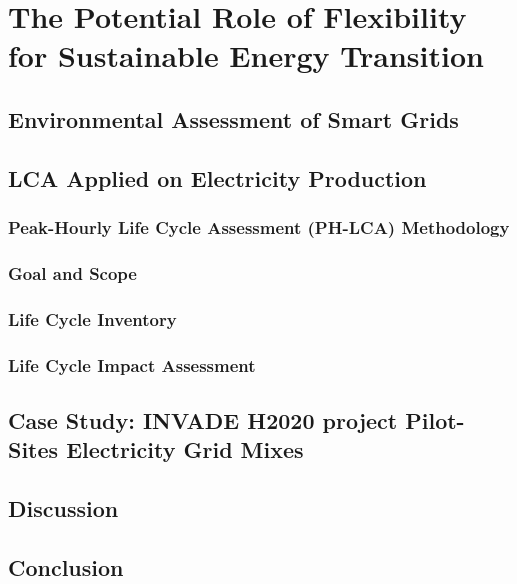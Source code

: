 \chapter{The Potential Role of Flexibility for Sustainable Energy Transition}
\label{chapterLCA}
\section{Environmental Assessment of Smart Grids}
\section{LCA Applied on Electricity Production}
\subsection{Peak-Hourly Life Cycle Assessment (PH-LCA) Methodology}
\subsection{Goal and Scope}
\subsection{Life Cycle Inventory}
\subsection{Life Cycle Impact Assessment}
\section{Case Study: INVADE H2020 project Pilot-Sites Electricity Grid Mixes}
\section{Discussion}
\section{Conclusion}

	




